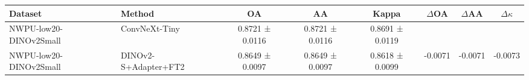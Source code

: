\begin{tabular}{l l c c c c c c}
\toprule
Dataset & Method & OA & AA & Kappa & $\Delta$OA & $\Delta$AA & $\Delta\kappa$ \\
\midrule
NWPU-low20-DINOv2Small & ConvNeXt-Tiny & 0.8721 ± 0.0116 & 0.8721 ± 0.0116 & 0.8691 ± 0.0119 &  &  &  \\
NWPU-low20-DINOv2Small & DINOv2-S+Adapter+FT2 & 0.8649 ± 0.0097 & 0.8649 ± 0.0097 & 0.8618 ± 0.0099 & -0.0071 & -0.0071 & -0.0073 \\
\bottomrule
\end{tabular}
